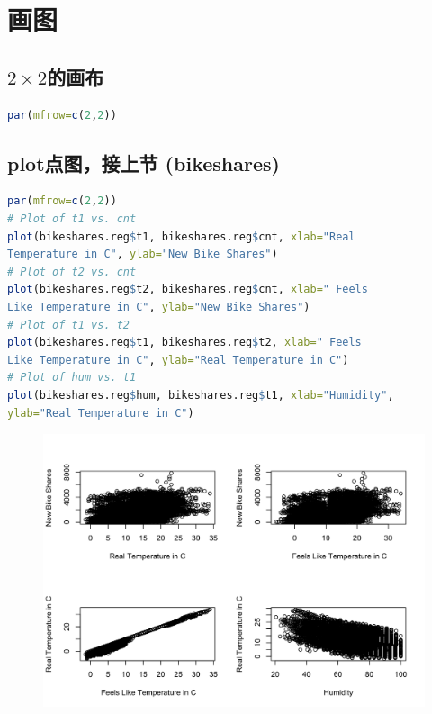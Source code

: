 \documentclass[11pt,a4paper]{article}
\begin{document}
\section{画图}

\subsection{$2\times2$的画布}
\begin{lstlisting}[language=R]
par(mfrow=c(2,2))
\end{lstlisting}
\subsection{plot点图，接上节 (bikeshares)}
\begin{lstlisting}[language=R]
par(mfrow=c(2,2))
# Plot of t1 vs. cnt
plot(bikeshares.reg$t1, bikeshares.reg$cnt, xlab="Real
Temperature in C", ylab="New Bike Shares")
# Plot of t2 vs. cnt
plot(bikeshares.reg$t2, bikeshares.reg$cnt, xlab=" Feels
Like Temperature in C", ylab="New Bike Shares")
# Plot of t1 vs. t2
plot(bikeshares.reg$t1, bikeshares.reg$t2, xlab=" Feels
Like Temperature in C", ylab="Real Temperature in C")
# Plot of hum vs. t1
plot(bikeshares.reg$hum, bikeshares.reg$t1, xlab="Humidity",
ylab="Real Temperature in C")
\end{lstlisting}
\begin{center}\begin{figure}[htbp]
    \centering
    \includegraphics[scale=0.3]{Bike.png}
    \caption{}
    \label{}
\end{figure}\end{center}
\end{document}
